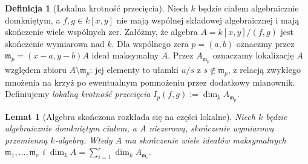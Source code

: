 \documentclass[11pt,a4paper,openany]{report}
\numberwithin{equation}{section}
\theoremstyle{plain}
\newtheorem{lemat}[twierdzenie]{Lemat}
\theoremstyle{definition}
\newtheorem{definicja}[twierdzenie]{Definicja}
\theoremstyle{remark}
\begin{document}
\begin{definicja}[Lokalna krotność przecięcia]
\label{def:intersection-multiplicity}
Niech $k$ będzie ciałem algebraicznie domkniętym,
a $f,g\in k[x,y]$ nie mają wspólnej składowej algebraicznej
i mają skończenie wiele wspólnych zer.
Załóżmy, że algebra $A=k[x,y]/(f,g)$ jest skończenie wymiarowa
nad $k$. Dla wspólnego zera $p=(a,b)$ oznaczmy przez
$\mathfrak m_p=(x-a,y-b)A$ ideał maksymalny $A$.
Przez $A_{\mathfrak m_p}$ oznaczamy lokalizację $A$
względem zbioru $A\setminus\mathfrak m_p$:
jej elementy to ułamki $u/s$ z $s\notin\mathfrak m_p$,
z relacją zwykłego mnożenia na krzyż po ewentualnym
pomnożeniu przez dodatkowy mianownik.
Definiujemy \emph{lokalną krotność przecięcia}
$I_p(f,g):=\dim_k A_{\mathfrak m_p}$.
\end{definicja}

\begin{lemat}[Algebra skończona rozkłada się na części lokalne]
\label{lem:artin-decomposition}
Niech $k$ będzie algebraicznie domkniętym ciałem,
a $A$ niezerową, skończenie wymiarową przemienną $k$-algebrą.
Wtedy $A$ ma skończenie wiele ideałów maksymalnych
$\mathfrak m_1,\ldots,\mathfrak m_r$ i
$\dim_kA=\sum_{i=1}^r\dim_k A_{\mathfrak m_i}$.
\end{lemat}
\end{document}
